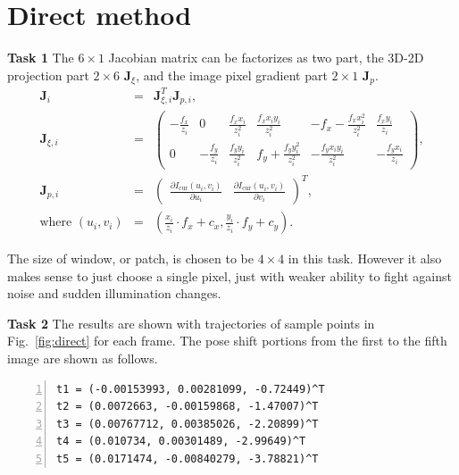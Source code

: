 \documentclass[12pt,a4paper]{article}
\newcommand{\mtx}[1]{\mathbf{#1}}
\begin{document}
    \section{Direct method}
    
    \textsf{\textbf{Task 1}}
    The $6 \times 1$ Jacobian matrix can be factorizes as two part,
    the 3D-2D projection part $2 \times 6$ $\mtx{J}_{\xi}$,
    and the image pixel gradient part $2 \times 1$ $\mtx{J}_{p}$.
    \begin{eqnarray}\label{eq:lk_fwd}
      \mtx{J}_i &=& \mtx{J}_{\xi,i}^T \mtx{J}_{p,i}, \nonumber\\
      \mtx{J}_{\xi,i} &=& \begin{pmatrix}
        -\frac{f_x}{z_{i}} & 0 & \frac{f_x  x_{i}}{z_{i}^2} & \frac{f_x  x_{i} y_{i}}{z_{i}^2} & -f_x - \frac{f_x  x_{i}^2}{z_{i}^2} & \frac{f_x y_{i}}{z_{i}} \\
        0 & -\frac{f_y}{z_{i}} & \frac{f_y  y_{i}}{z_{i}^2} & f_y + \frac{f_y  y_{i}^2}{z_{i}^2} & -\frac{f_y x_{i} y_{i}}{z_{i}^2} & -\frac{f_y x_{i}}{z_{i}} 
      \end{pmatrix}, \nonumber\\
      \mtx{J}_{p,i} &=& \begin{pmatrix}
        \frac{\partial I_{\text{cur}}(u_i , v_i)}{\partial u_i} &
        \frac{\partial I_{\text{cur}}(u_i , v_i)}{\partial v_i} 
      \end{pmatrix}^T, \nonumber\\
      \text{where } (u_i,v_i) &=&
      (\frac{x_i}{z_i}\cdot f_x + c_x, \frac{y_i}{z_i}\cdot f_y + c_y).
    \end{eqnarray}
    
    The size of window, or patch, is chosen to be $4 \times 4$ in this task.
    However it also makes sense to just choose a single pixel,
    just with weaker ability to fight against noise and sudden illumination changes.
    
    \textsf{\textbf{Task 2}}
    The results are shown with trajectories of sample points in Fig.~\ref{fig:direct}
    for each frame. The pose shift portions from the first to the fifth
    image are shown as follows.
    \begin{lstlisting}[frame=single,numbers=left]
t1 = (-0.00153993, 0.00281099, -0.72449)^T
t2 = (0.0072663, -0.00159868, -1.47007)^T
t3 = (0.00767712, 0.00385026, -2.20899)^T
t4 = (0.010734, 0.00301489, -2.99649)^T
t5 = (0.0171474, -0.00840279, -3.78821)^T
    \end{lstlisting}
\end{document}
